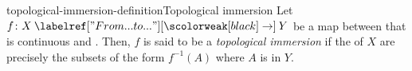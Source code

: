\documentclass[preview]{standalone}
\begin{document}
\begin{snippetdefinition}{topological-immersion-definition}{Topological immersion}
    Let \(f \colon X \fromto Y\)
    be a map between  that is continuous and \injective.
    Then, \(f\) is said to be a \emph{topological immersion}
    if the 
    of \(X\) are precisely the subsets of the form \(f^{-1}(A)\)
    where \(A\) is \topologicalspace[open][Open] in \(Y\).
\end{snippetdefinition}
\end{document}
